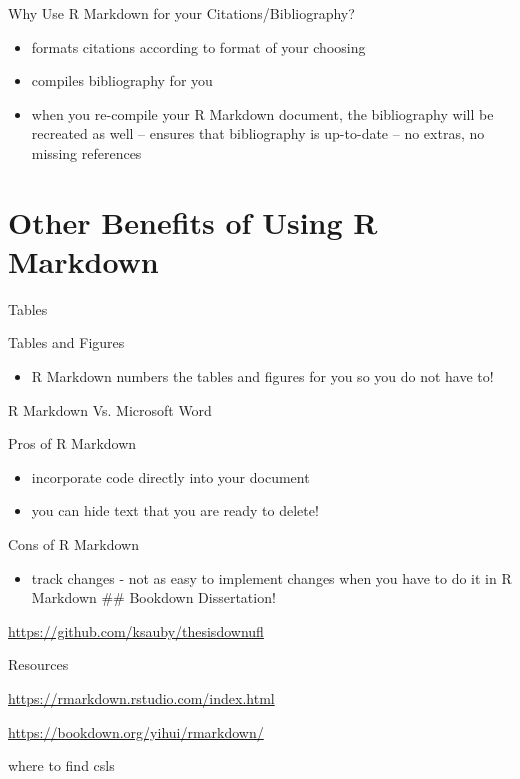 \documentclass[ignorenonframetext,]{beamer}
\providecommand{\tightlist}{%
  \setlength{\itemsep}{0pt}\setlength{\parskip}{0pt}}
\begin{document}
\begin{frame}{Why Use R Markdown for your Citations/Bibliography?}

\begin{itemize}
\tightlist
\item
  formats citations according to format of your choosing
\item
  compiles bibliography for you
\item
  when you re-compile your R Markdown document, the bibliography will be
  recreated as well -- ensures that bibliography is up-to-date -- no
  extras, no missing references
\end{itemize}

\end{frame}

\section{Other Benefits of Using R
Markdown}\label{other-benefits-of-using-r-markdown}

\begin{frame}{Tables}

\end{frame}

\begin{frame}{Tables and Figures}

\begin{itemize}
\tightlist
\item
  R Markdown numbers the tables and figures for you so you do not have
  to!
\end{itemize}

\end{frame}

\begin{frame}{R Markdown Vs. Microsoft Word}

Pros of R Markdown

\begin{itemize}
\tightlist
\item
  incorporate code directly into your document
\item
  you can hide text that you are ready to delete!
\end{itemize}

Cons of R Markdown

\begin{itemize}
\tightlist
\item
  track changes - not as easy to implement changes when you have to do
  it in R Markdown \#\# Bookdown Dissertation!
\end{itemize}

\url{https://github.com/ksauby/thesisdownufl}

\end{frame}

\begin{frame}{Resources}

\url{https://rmarkdown.rstudio.com/index.html}

\url{https://bookdown.org/yihui/rmarkdown/}

where to find csls

\end{frame}
\end{document}
